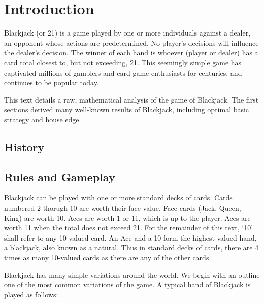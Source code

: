 
\chapter{Introduction}
\label{sec:intro}

Blackjack (or 21) is a game played by one or more individuals against
a dealer, an opponent whose actions are predetermined.
No player's decisions will influence the dealer's decision.  
The winner of each hand is whoever (player or dealer)
has a card total closest to, but not exceeding, 21.  
This seemingly simple game has captivated millions of gamblers
and card game enthusiasts for centuries, 
and continues to be popular today.

This text details a raw, mathematical analysis of the game of Blackjack.
The first sections derived many well-known results of Blackjack, 
including optimal basic strategy and house edge.



\section{History}
\label{sec:intro:history}

\section{Rules and Gameplay}
\label{sec:intro:rules}

Blackjack can be played with one or more standard decks of cards.
Cards numbered 2 thorugh 10 are worth their face value.  
Face cards (Jack, Queen, King) are worth 10.
Aces are worth 1 or 11, which is up to the player.
Aces are worth 11 when the total does not exceed 21.
For the remainder of this text, `10' shall refer to any 10-valued card.
An Ace and a 10 form the highest-valued hand, a blackjack, 
also known as a natural.
Thus in standard decks of cards, there are 4 times as many 10-valued 
cards as there are any of the other cards.

Blackjack has many simple variations around the world.
We begin with an outline one of the most common variations of the game.
A typical hand of Blackjack is played as follows:

